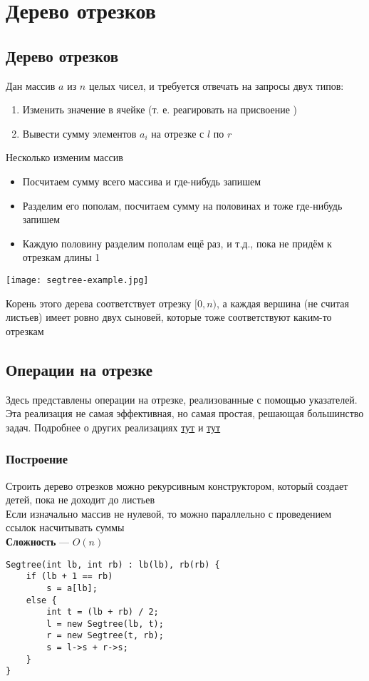 \documentclass[a4paper]{article}
\begin{document}
\section{Дерево отрезков}
\subsection{Дерево отрезков}
Дан массив $a$ из $n$ целых чисел, и требуется отвечать на запросы двух типов:
\begin{enumerate}
    \item Изменить значение в ячейке (т. е. реагировать на присвоение )
    \item Вывести сумму элементов $a_i$ на отрезке с $l$ по $r$
\end{enumerate}
Несколько изменим массив
\begin{itemize}
    \item Посчитаем сумму всего массива и где-нибудь запишем
    \item Разделим его пополам, посчитаем сумму на половинах и тоже где-нибудь запишем
    \item Каждую половину разделим пополам ещё раз, и т.д., пока не придём к отрезкам длины 1
\end{itemize}
\begin{center}
    \texttt{[image: segtree-example.jpg]}
    \label{segtree-ex}
\end{center}
Корень этого дерева соответствует отрезку $[0, n)$, а каждая вершина (не считая листьев) имеет ровно двух сыновей, которые тоже соответствуют каким-то отрезкам

\subsection{Операции на отрезке}
Здесь представлены операции на отрезке, реализованные с помощью указателей. Эта реализация не самая эффективная, но самая простая, решающая большинство задач. Подробнее о других реализациях \href{http://e-maxx.ru/algo/segment_tree}{тут} и \href{https://codeforces.com/blog/entry/18051}{тут}
\subsubsection{Построение}
Строить дерево отрезков можно рекурсивным конструктором, который создает детей, пока не доходит до листьев\\[2mm]
\indent Если изначально массив не нулевой, то можно параллельно с проведением ссылок насчитывать суммы\\[2mm]
\indent \textbf{Сложность} — $O(n)$
\begin{lstlisting}
Segtree(int lb, int rb) : lb(lb), rb(rb) {
    if (lb + 1 == rb)
        s = a[lb];
    else {
        int t = (lb + rb) / 2;
        l = new Segtree(lb, t);
        r = new Segtree(t, rb);
        s = l->s + r->s;
    }
}
\end{lstlisting}
\end{document}
